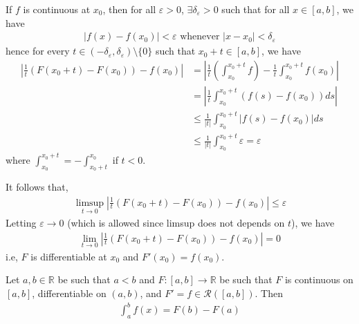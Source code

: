 \documentclass{tufte-handout}
\begin{document}
If \( f \) is continuous at \( x_0 \), then for all \( \varepsilon > 0 \), 
\(\exists \delta_\varepsilon > 0 \) such that
for all \( x \in [a,b]\), we have 
\begin{align}
    |f(x) - f(x_0)| < \varepsilon \text{ whenever } |x-x_0| < \delta_\varepsilon
\end{align}
hence for every \(t \in (-\delta_\varepsilon, \delta_\varepsilon) \setminus \{0\}\) such that \( x_0 + t \in [a,b] \), we have
\begin{align}
    \left|\frac{1}{t}\left(F(x_0 + t) - F(x_0)\right) - f(x_0)\right| &=
    \left|\frac{1}{t}\left(\int_{x_0}^{x_0+t}f\right) - \frac{1}{t}\int_{x_0}^{x_0+t}f(x_0)\right| \\
    &= \left|\frac{1}{t}\int_{x_0}^{x_0+t}(f(s) - f(x_0))ds\right| \\
    &\leq \frac{1}{|t|}\int_{x_0}^{x_0+t}|f(s) - f(x_0)|ds \\
    &\leq \frac{1}{|t|}\int_{x_0}^{x_0+t}\varepsilon = \varepsilon
\end{align}
where \(\int_{x_0}^{x_0+t} = -\int_{x_0+t}^{x_0}\) if \( t < 0 \).

It follows that, 
\begin{align}
    \limsup_{t\to 0}\left|\frac{1}{t}\left(F(x_0 + t) - F(x_0)\right) - f(x_0)\right| \leq \varepsilon
\end{align}
Letting \( \varepsilon \to 0 \) (which is allowed since 
limsup does not depends on \( t \)), we have
\begin{align}
    \lim_{t\to 0}\left|\frac{1}{t}\left(F(x_0 + t) - F(x_0)\right) - f(x_0)\right| = 0
\end{align}
i.e, \( F \) is differentiable at \( x_0 \) and \( F'(x_0) = f(x_0) \).
\hfill \qedsymbol

\begin{Theorem}
    Let \( a,b \in \mathbb{R} \) be such that \( a<b \) and
    \( F: [a,b] \to \mathbb{R} \) be such that \( F \) is continuous on 
    \([a,b]\), differentiable on \( (a,b) \), and \( F' = f \in \mathcal{R}([a,b]) \).
    Then
    \begin{align}
        \int_{a}^b f(x) = F(b) - F(a)
    \end{align}
\end{Theorem}
\end{document}
